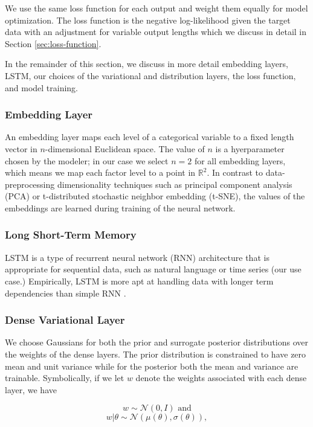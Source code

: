 \documentclass{article}
\begin{document}
We use the same loss function for each output and weight them equally for model optimization. The loss function is the negative log-likelihood given the target data with an adjustment for variable output lengths which we discuss in detail in Section \ref{sec:loss-function}.

In the remainder of this section, we discuss in more detail embedding layers, LSTM, our choices of the variational and distribution layers, the loss function, and model training.

\subsubsection{Embedding Layer}

An embedding layer maps each level of a categorical variable to a fixed length vector in $n$-dimensional Euclidean space. The value of $n$ is a hyerparameter chosen by the modeler; in our case we select $n = 2$ for all embedding layers, which means we map each factor level to a point in $\mathbb{R}^2$. In contrast to data-preprocessing dimensionality techniques such as principal component analysis (PCA) or t-distributed stochastic neighbor embedding (t-SNE), the values of the embeddings are learned during training of the neural network.

\subsubsection{Long Short-Term Memory}

LSTM is a type of recurrent neural network (RNN) architecture that is appropriate for sequential data, such as natural language or time series (our use case.) Empirically, LSTM is more apt at handling data with longer term dependencies than simple RNN \cite{lecun2015deep}.

\subsubsection{Dense Variational Layer}

We choose Gaussians for both the prior and surrogate posterior distributions over the weights of the dense layers. The prior distribution is constrained to have zero mean and unit variance while for the posterior both the mean and variance are trainable. Symbolically, if we let $w$ denote the weights associated with each dense layer, we have

\begin{equation}
    w \sim \mathcal{N}(0, I) \text{ and}
\end{equation}
\begin{equation}
    w|\theta \sim \mathcal{N}(\mu(\theta), \sigma(\theta)),
\end{equation}
\end{document}
